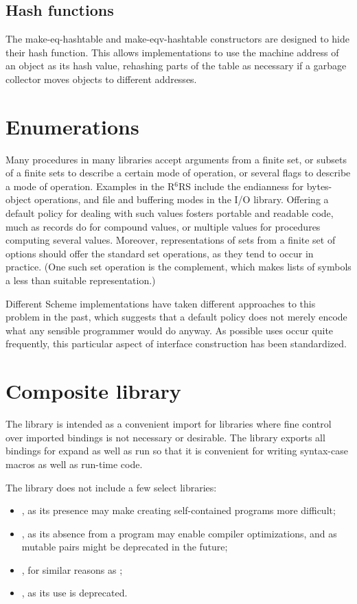 \documentclass[twoside,twocolumn]{algol60}
\newcommand{\rn}[1]{R$^{#1}$RS}
\begin{document}
\section{Hash functions}

The {\cf make-eq-hashtable} and {\cf make-eqv-hashtable} constructors
are designed to hide their hash function.  This allows implementations
to use the machine address of an object as its hash value, rehashing
parts of the table as necessary if a garbage collector moves
objects to different addresses.

\chapter{Enumerations}

Many procedures in many libraries accept arguments from a finite set,
or subsets of a finite sets to describe a certain mode of operation,
or several flags to describe a mode of operation.  Examples in the
\rn{6} include the endianness for bytes-object operations, and file
and buffering modes in the I/O library.  Offering a default policy for
dealing with such values fosters portable and readable code, much as
records do for compound values, or multiple values for procedures
computing several values.  Moreover, representations of sets from a
finite set of options should offer the standard set operations, as
they tend to occur in practice.  (One such set operation is the
complement, which makes lists of symbols a less than suitable
representation.)

Different Scheme implementations have taken different approaches to
this problem in the past, which suggests that a default policy does
not merely encode what any sensible programmer would do anyway.  As
possible uses occur quite frequently, this particular aspect of
interface construction has been standardized.


\chapter{Composite library}

The \thersixlibrary{} library is intended as a convenient import for
libraries where fine control over imported bindings is not necessary
or desirable. The \thersixlibrary{} library exports all bindings for
{\cf expand} as well as {\cf run} so that it is convenient for writing
{\cf syntax-case} macros as well as run-time code.

The \rsixlibrary{} library does not include a few select libraries:
%
\begin{itemize}
\item {}, as its presence may make creating
  self-contained programs more difficult;
\item {}, as its absence from a program may enable compiler
  optimizations, and as mutable pairs might be deprecated in the future;
\item {}, for similar reasons as
  ;
\item {}, as its use is deprecated.
\end{itemize}
\end{document}
